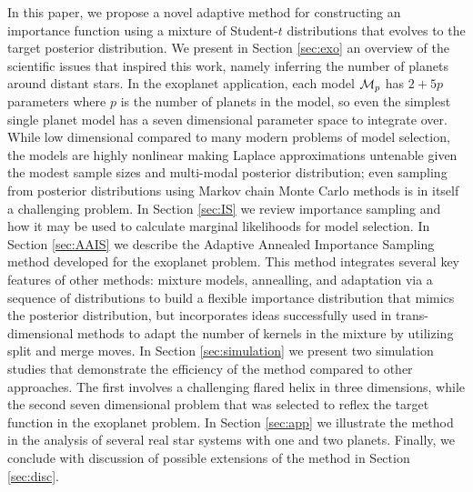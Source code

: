 In this paper, we propose a novel adaptive method for constructing an
importance function using a mixture of Student-$t$ distributions that
evolves to the target posterior distribution. We present in Section
\ref{sec:exo} an overview of the scientific issues that inspired this
work, namely inferring the number of planets around distant stars. In
the exoplanet application, each model ${\cal{M}}_p$ has $2+5p$ parameters
where $p$ is the number of planets in the model, so even the simplest
single planet model has a seven dimensional parameter space to
integrate over. While low dimensional compared to many modern problems
of model selection, the models are highly nonlinear making Laplace
approximations untenable given the modest sample sizes and multi-modal
posterior distribution; even sampling from posterior distributions
using Markov chain Monte Carlo methods is in itself a challenging
problem.  In Section \ref{sec:IS} we review importance sampling and
how it may be used to calculate marginal likelihoods for model
selection. In Section \ref{sec:AAIS} we describe the Adaptive Annealed
Importance Sampling method developed for the exoplanet problem. This
method integrates several key features of other methods: mixture
models, annealling, and adaptation via a sequence of distributions to
build a flexible importance distribution that mimics the posterior
distribution, but incorporates ideas successfully used in
trans-dimensional methods to adapt the number of kernels in the
mixture by utilizing split and merge moves.  In Section
\ref{sec:simulation} we present two simulation studies that
demonstrate the efficiency of the method compared to other approaches.
The first involves a challenging flared helix in three dimensions,
while the second seven dimensional problem that was selected to reflex
the target function in the exoplanet problem.  In Section
\ref{sec:app} we illustrate the method in the analysis of
several real star systems with one and two planets. Finally, we conclude with
discussion of possible extensions of the method in Section
\ref{sec:disc}.
